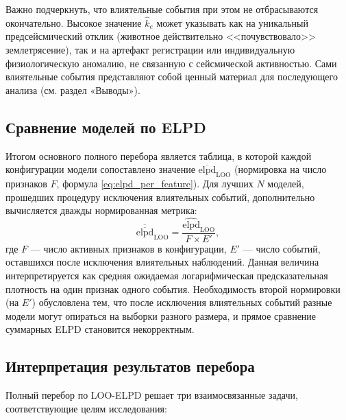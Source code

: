 \documentclass[14pt]{mmcs_article}
\begin{document}
Важно подчеркнуть, что влиятельные события при этом не
отбрасываются окончательно. Высокое значение $\hat{k}_e$
может указывать как на уникальный предсейсмический отклик
(животное действительно <<почувствовало>> землетрясение),
так и на артефакт регистрации или индивидуальную
физиологическую аномалию, не связанную с сейсмической
активностью. Сами влиятельные события представляют собой
ценный материал для последующего анализа (см. раздел
«Выводы»).

\subsection*{Сравнение моделей по ELPD}

Итогом основного полного перебора является таблица, в которой
каждой конфигурации модели сопоставлено значение
$\overline{\mathrm{elpd}}_{\mathrm{LOO}}$ (нормировка на число
признаков $F$, формула \eqref{eq:elpd_per_feature}). Для
лучших $N$ моделей, прошедших процедуру исключения
влиятельных событий, дополнительно вычисляется дважды
нормированная метрика:
\begin{equation}\label{eq:elpd_fully_normalized}
	\overline{\overline{\mathrm{elpd}}}_{\mathrm{LOO}} = 
	\frac{\widehat{\mathrm{elpd}}_{\mathrm{LOO}}}{F \times E'},
\end{equation}
где $F$ — число активных признаков в конфигурации, $E'$ — число
событий, оставшихся после исключения влиятельных наблюдений.
Данная величина интерпретируется как средняя ожидаемая
логарифмическая предсказательная плотность на один признак
одного события. Необходимость второй нормировки (на $E'$)
обусловлена тем, что после исключения влиятельных событий
разные модели могут опираться на выборки разного размера, и
прямое сравнение суммарных ELPD становится некорректным.

\subsection*{Интерпретация результатов перебора}

Полный перебор по LOO-ELPD решает три взаимосвязанные задачи,
соответствующие целям исследования:
\end{document}
